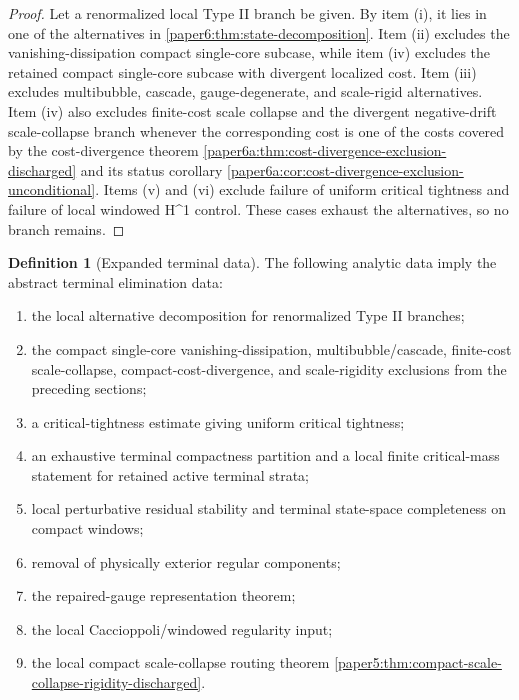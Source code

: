\documentclass[11pt]{amsart}
\def\({}%
\def\){}%
\theoremstyle{plain}
\theoremstyle{definition}
\newtheorem{definition}[definition]{Definition}
\theoremstyle{remark}
\begin{document}
\begin{proof}
Let a renormalized local Type II branch be given.  By item \textup{(i)}, it
lies in one of the alternatives in \cref{paper6:thm:state-decomposition}.
Item \textup{(ii)} excludes the vanishing-dissipation compact single-core
subcase, while item \textup{(iv)} excludes the retained compact single-core
subcase with divergent localized cost.  Item \textup{(iii)} excludes
multibubble, cascade, gauge-degenerate, and scale-rigid alternatives.  Item
\textup{(iv)} also excludes finite-cost scale collapse and the divergent
negative-drift scale-collapse branch whenever the corresponding cost is one of
the costs covered by the cost-divergence theorem
\cref{paper6a:thm:cost-divergence-exclusion-discharged} and its status
corollary \cref{paper6a:cor:cost-divergence-exclusion-unconditional}.  Items
\textup{(v)} and
\textup{(vi)} exclude failure of uniform critical tightness and failure of
local windowed \(H^1\) control.  These cases exhaust the alternatives, so no
branch remains.
\end{proof}

\begin{definition}[Expanded terminal data]\label{paper6a:def:expanded-terminal-data}
The following analytic data imply the abstract terminal elimination data:
\begin{enumerate}[label=\textup{(\roman*)}]
\item the local alternative decomposition for renormalized Type II branches;
\item the compact single-core vanishing-dissipation, multibubble/cascade,
finite-cost scale-collapse, compact-cost-divergence, and scale-rigidity
exclusions from the preceding sections;
\item a critical-tightness estimate giving uniform critical tightness;
\item an exhaustive terminal compactness partition and a local finite
critical-mass statement for retained active terminal strata;
\item local perturbative residual stability and terminal state-space
completeness on compact windows;
\item removal of physically exterior regular components;
\item the repaired-gauge representation theorem;
\item the local Caccioppoli/windowed regularity input;
\item the local compact scale-collapse routing theorem
\cref{paper5:thm:compact-scale-collapse-rigidity-discharged}.
\end{enumerate}
\end{definition}
\end{document}

